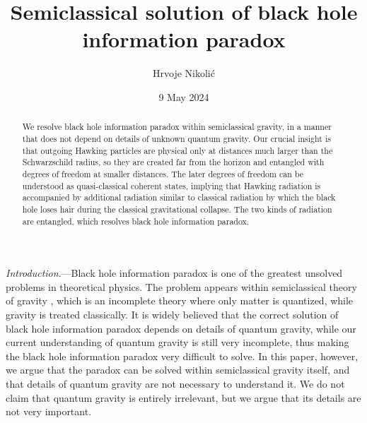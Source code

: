 \documentclass[aps,prd,onecolumn,groupedaddress,showkeys,12pt]{revtex4-2}
\begin{document}
\title{Semiclassical solution of black hole information paradox}

\author{Hrvoje Nikoli\'c}

\date{9 May 2024}

\begin{abstract}
\small
\baselineskip 14pt
We resolve black hole information paradox within semiclassical gravity, in a manner that does not depend on 
details of unknown quantum gravity. Our crucial insight is that outgoing Hawking particles are physical only 
at distances much larger than the Schwarzschild radius, so they are created far from the horizon and entangled 
with degrees of freedom at smaller distances. The later degrees of freedom can be understood as 
quasi-classical coherent states, implying that Hawking radiation is accompanied by additional 
radiation similar to classical radiation by which the black hole loses hair during the classical gravitational 
collapse. The two kinds of radiation are entangled, which resolves black hole information paradox. 
\end{abstract}



\maketitle

{\it Introduction}.---Black hole information paradox 
\cite{gid,math1,math2,hoss,dundar,harlow,polchinski,chakra,marolf,fabbri}
is one of the greatest unsolved problems in theoretical physics. 
The problem appears within semiclassical theory of gravity 
\cite{bd,mukhanov}, which is an incomplete theory 
where only matter is quantized, while gravity is treated classically.
It is widely believed that the correct solution of black hole information paradox
depends on details of quantum gravity, while our current understanding of 
quantum gravity is still very incomplete, thus making the black hole information paradox 
very difficult to solve. In this paper, however, we argue that the paradox can be solved 
within semiclassical gravity itself, and that details of quantum gravity are not necessary
to understand it. We do not claim that quantum gravity is entirely irrelevant, 
but we argue that its details are not very important.  
\end{document}
